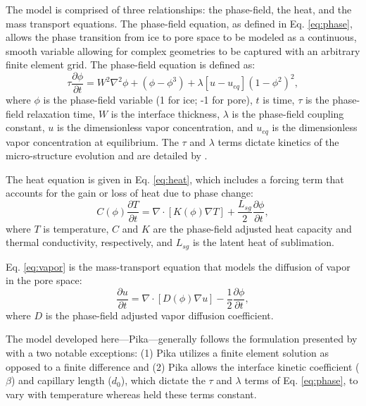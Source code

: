 The model is comprised of three relationships: the phase-field, the heat, and the mass transport equations. The phase-field equation, as defined in Eq. \eqref{eq:phase}, allows the phase transition from ice to pore space to be modeled as a continuous, smooth variable allowing for complex geometries to be captured with an arbitrary finite element grid. The phase-field equation is defined as:
\begin{equation}\label{eq:phase}
\tau \frac{\partial \phi}{\partial t} = W^2 \nabla^2 \phi +(\phi-\phi^3)+\lambda[u-u_{eq}](1-\phi^2)^2,
\end{equation}
where $\phi$ is the phase-field variable (1 for ice; -1 for pore), $t$ is time, $\tau$ is the phase-field relaxation time, $W$ is the interface thickness, $\lambda$ is the phase-field coupling constant, $u$ is the dimensionless vapor concentration, and $u_{eq}$ is the dimensionless vapor concentration at equilibrium. The $\tau$ and $\lambda$ terms dictate kinetics of the micro-structure evolution and are detailed by \citet{kaempfer2009phase}.

The heat equation is given in Eq. \eqref{eq:heat}, which includes a forcing term that accounts for the gain or loss of heat due to phase change:
\begin{equation}\label{eq:heat}
C(\phi)\frac{\partial T}{\partial t} = \nabla \cdot [K(\phi) \nabla T] + \frac{L_{sg}}{2}\frac{\partial \phi}{\partial t},
\end{equation}
where $T$ is temperature, $C$ and $K$ are the phase-field adjusted heat capacity and thermal conductivity, respectively, and $L_{sg}$ is the latent heat of sublimation.

Eq. \ref{eq:vapor} is the mass-transport equation that models the diffusion of vapor in the pore space:
\begin{equation}\label{eq:vapor}
\frac{\partial u}{\partial t} = \nabla \cdot[ D(\phi) \nabla u] - \frac{1}{2}\frac{\partial \phi}{\partial t},
\end{equation}
where $D$ is the phase-field adjusted vapor diffusion coefficient.

The model developed here---Pika---generally follows the formulation presented by \citet{kaempfer2009phase} with a two notable exceptions: (1) Pika utilizes a finite element solution as opposed to a finite difference and (2) Pika allows the interface kinetic coefficient ($\beta$) and capillary length ($d_0$), which dictate the $\tau$ and $\lambda$ terms of Eq. \eqref{eq:phase}, to vary with temperature whereas \citet{kaempfer2009phase} held these terms constant.

